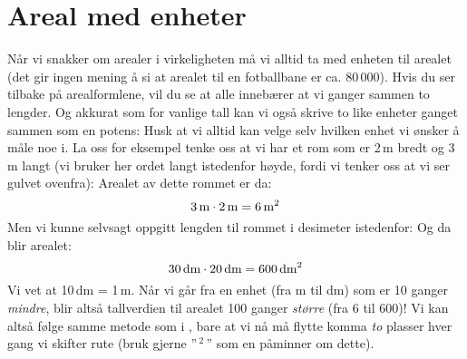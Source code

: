 \section{Areal med enheter}
Når vi snakker om arealer i virkeligheten må vi alltid ta med enheten til arealet (det gir ingen mening å si at arealet til en fotballbane er ca. 80\,000). Hvis du ser tilbake på arealformlene, vil du se at alle innebærer at vi ganger sammen to lengder. Og akkurat som for vanlige tall kan vi også skrive to like enheter ganget sammen som en potens:
Husk at vi alltid kan velge selv hvilken enhet vi ønsker å måle noe i. La oss for eksempel tenke oss at vi har et rom som er 2\,m bredt og 3\,m langt (vi bruker her ordet langt istedenfor høyde, fordi vi tenker oss at vi ser gulvet ovenfra):
Arealet av dette rommet er da:
\[ 3\,\textrm{m}\cdot 2\,\textrm{m}=6\,\textrm{m}^2 \]
Men vi kunne selvsagt oppgitt lengden til rommet i desimeter istedenfor:
Og da blir arealet:
\[ 30\,\textrm{dm}\cdot 20\,\textrm{dm}=600\,\textrm{dm}^2 \]
Vi vet at 10\,dm = 1\,m. Når vi går fra en enhet (fra m til dm) som er 10 ganger \textsl{mindre}, blir altså tallverdien til arealet 100 ganger \textsl{større} (fra 6 til 600)! Vi kan altså følge samme metode som i , bare at vi nå må flytte komma \textsl{to} plasser hver gang vi skifter rute (bruk gjerne ''\,$ ^2 $\,'' som en påminner om dette).
